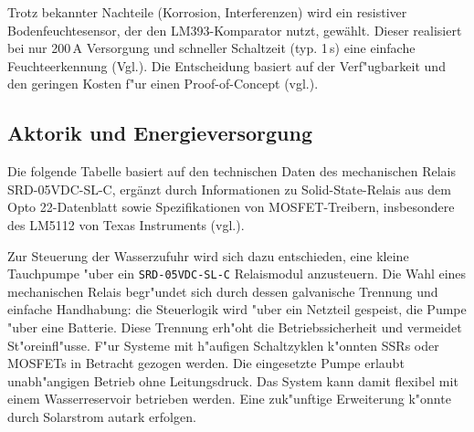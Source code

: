 \noindent Trotz bekannter Nachteile (Korrosion, Interferenzen) wird ein resistiver Bodenfeuchtesensor, der den LM393-Komparator nutzt, gewählt. Dieser realisiert bei nur 200\,\textmu A Versorgung und schneller Schaltzeit (typ. 1\,\textmu s) eine einfache Feuchteerkennung (Vgl.\autocite{lm393}). Die Entscheidung basiert auf der Verf"ugbarkeit und den geringen Kosten f"ur einen Proof-of-Concept (vgl.\autocite{components101_soilmoisture}).


\subsection{Aktorik und Energieversorgung}

Die folgende Tabelle basiert auf den technischen Daten des mechanischen Relais SRD-05VDC-SL-C, ergänzt durch Informationen zu Solid-State-Relais aus dem Opto 22-Da\-ten\-blatt sowie Spezifikationen von MOSFET-Treibern, insbesondere des LM5112 von Texas Instruments (vgl.\autocite{SRD05_datasheet,opto22_ssr,wolles_mosfet}).
\\

\begin{table}[H]
	\centering
	\caption{Vergleich von Schaltkonzepten zur Aktorsteuerung}
	\label{tab:aktorik-vergleich}
\end{table}
\vspace{1em}

\noindent Zur Steuerung der Wasserzufuhr wird sich dazu entschieden, eine kleine Tauchpumpe "uber ein \texttt{SRD-05VDC-SL-C} Relaismodul anzusteuern. Die Wahl eines mechanischen Relais begr"undet sich durch dessen galvanische Trennung und einfache Handhabung: die Steuerlogik wird "uber ein Netzteil gespeist, die Pumpe "uber eine Batterie. Diese Trennung erh"oht die Betriebssicherheit und vermeidet St"oreinfl"usse. F"ur Systeme mit h"aufigen Schaltzyklen k"onnten SSRs oder MOSFETs in Betracht gezogen werden. Die eingesetzte Pumpe erlaubt unabh"angigen Betrieb ohne Leitungsdruck. Das System kann damit flexibel mit einem Wasserreservoir betrieben werden. Eine zuk"unftige Erweiterung k"onnte durch Solarstrom autark erfolgen.\\

